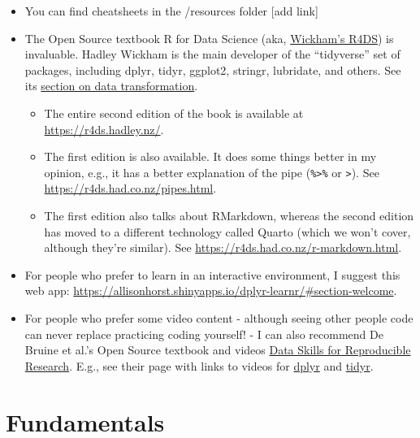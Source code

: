 \documentclass[
  letterpaper,
  DIV=11,
  numbers=noendperiod]{scrreprt}
\providecommand{\tightlist}{%
  \setlength{\itemsep}{0pt}\setlength{\parskip}{0pt}}\usepackage{longtable,booktabs,array}
\begin{document}
\begin{itemize}
\tightlist
\item
  You can find cheatsheets in the /resources folder {[}\TODO add link{]}
\item
  The Open Source textbook R for Data Science (aka,
  \href{https://r4ds.hadley.nz/}{Wickham's R4DS}) is invaluable. Hadley
  Wickham is the main developer of the ``tidyverse'' set of packages,
  including dplyr, tidyr, ggplot2, stringr, lubridate, and others. See
  its \href{https://r4ds.hadley.nz/data-transform}{section on data
  transformation}.

  \begin{itemize}
  \tightlist
  \item
    The entire second edition of the book is available at
    \url{https://r4ds.hadley.nz/}.
  \item
    The first edition is also available. It does some things better in
    my opinion, e.g., it has a better explanation of the pipe
    (\texttt{\%\textgreater{}\%} or \texttt{\textbar{}\textgreater{}}).
    See \url{https://r4ds.had.co.nz/pipes.html}.
  \item
    The first edition also talks about RMarkdown, whereas the second
    edition has moved to a different technology called Quarto (which we
    won't cover, although they're similar). See
    \url{https://r4ds.had.co.nz/r-markdown.html}.
  \end{itemize}
\item
  For people who prefer to learn in an interactive environment, I
  suggest this web app:
  \url{https://allisonhorst.shinyapps.io/dplyr-learnr/\#section-welcome}.
\item
  For people who prefer some video content - although seeing other
  people code can never replace practicing coding yourself! - I can also
  recommend De Bruine et al.'s Open Source textbook and videos
  \href{https://psyteachr.github.io/reprores-v3/}{Data Skills for
  Reproducible Research}. E.g., see their page with links to videos for
  \href{https://psyteachr.github.io/reprores-v3/dplyr.html}{dplyr} and
  \href{https://psyteachr.github.io/reprores-v3/tidyr.html}{tidyr}.
\end{itemize}


\chapter{Fundamentals}\label{fundamentals}
\end{document}
